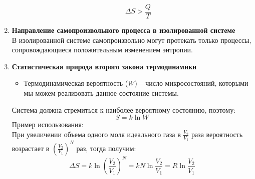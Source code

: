 \documentclass[14pt,a4paper]{scrartcl}
\begin{document}
\begin{enumerate}[label=\arabic*)]
\begin{itemize}
		$$ \Delta{S} > \dfrac{Q}{T} $$
	\end{itemize}
	\item \textbf{Направление самопроизвольного процесса в изолированной системе} \\
	В изолированной системе самопроизвольно могут протекать только процессы, сопровождающиеся положительным изменением энтропии.
	\item \textbf{Статистическая природа второго закона термодинамики} \\
	\begin{itemize}
		\item Термодинамическая вероятность ($W$) -- число микросостояний, которыми мы можем реализовать данное состояние системы.
		
	\end{itemize}
	Система должна стремиться к наиболее вероятному состоянию, поэтому:
	$$ S = k \ln{W} $$
	Пример использования: \\
	При увеличении объема одного моля идеального газа в $\frac{V_2}{V_1}$ раза вероятность возрастает в $(\frac{V_2}{V_1})^N$ раз, тогда получим:
	$$ \Delta{S} = k \ln{(\frac{V_2}{V_1})^N} = k N \ln{\frac{V_2}{V_1}} = R \ln{\frac{V_2}{V_1}} $$ 
\end{enumerate}	
\end{document}
